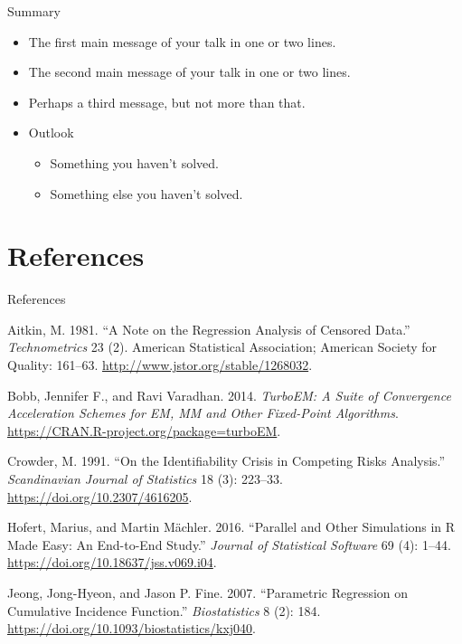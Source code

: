 \documentclass{beamer}
\begin{document}
\begin{frame}{Summary}
  \begin{itemize}
  \item
    The \alert{first main message} of your talk in one or two lines.
  \item
    The \alert{second main message} of your talk in one or two lines.
  \item
    Perhaps a \alert{third message}, but not more than that.
  \end{itemize}
  
  \begin{itemize}
  \item
    Outlook
    \begin{itemize}
    \item
      Something you haven't solved.
    \item
      Something else you haven't solved.
    \end{itemize}
  \end{itemize}
\end{frame}







\section{References}\label{references}

\begin{frame}[allowframebreaks]{References}
\label{References}

Aitkin, M. 1981. ``A Note on the Regression Analysis of Censored Data.''
\emph{Technometrics} 23 (2). American Statistical Association; American
Society for Quality: 161--63. \url{http://www.jstor.org/stable/1268032}.

Bobb, Jennifer F., and Ravi Varadhan. 2014. \emph{TurboEM: A Suite of
Convergence Acceleration Schemes for EM, MM and Other Fixed-Point
Algorithms}. \url{https://CRAN.R-project.org/package=turboEM}.

Crowder, M. 1991. ``On the Identifiability Crisis in Competing Risks
Analysis.'' \emph{Scandinavian Journal of Statistics}
18 (3): 223--33. \url{https://doi.org/10.2307/4616205}.

Hofert, Marius, and Martin Mächler. 2016. ``Parallel and Other
Simulations in R Made Easy: An End-to-End Study.'' \emph{Journal of
Statistical Software} 69 (4): 1--44.
\url{https://doi.org/10.18637/jss.v069.i04}.

Jeong, Jong-Hyeon, and Jason P. Fine. 2007. ``Parametric Regression on
Cumulative Incidence Function.'' \emph{Biostatistics} 8 (2): 184.
\url{https://doi.org/10.1093/biostatistics/kxj040}.

\end{frame}

\end{document}
